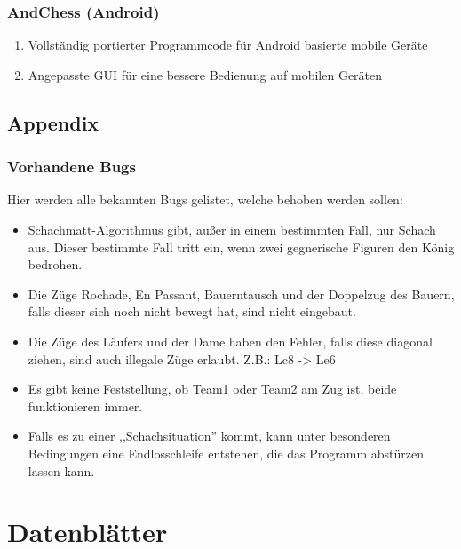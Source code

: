 \documentclass[12pt,a4paper]{article}
\begin{document}
\subsubsection{AndChess (Android)}

\begin{enumerate}
	\item{Vollständig portierter Programmcode für Android basierte mobile Geräte}
	\item{Angepasste GUI für eine bessere Bedienung auf mobilen Geräten}
\end{enumerate}

\subsection{Appendix}
\subsubsection{Vorhandene Bugs}

Hier werden alle bekannten Bugs gelistet, welche behoben werden sollen:

\begin{itemize}
	\item{Schachmatt-Algorithmus gibt, außer in einem bestimmten Fall, nur Schach aus. Dieser bestimmte Fall tritt ein, wenn zwei gegnerische Figuren den König bedrohen.}
	\item{Die Züge Rochade, En Passant, Bauerntausch und der Doppelzug des Bauern, falls dieser sich noch nicht bewegt hat, sind nicht eingebaut.}
	\item{Die Züge des Läufers und der Dame haben den Fehler, falls diese diagonal ziehen, sind auch illegale Züge erlaubt. Z.B.: Lc8 -> Le6}
	\item{Es gibt keine Feststellung, ob Team1 oder Team2 am Zug ist, beide funktionieren immer.}
	\item{Falls es zu einer ,,Schachsituation'' kommt, kann unter besonderen Bedingungen eine Endlosschleife entstehen, die das Programm abstürzen lassen kann.}
\end{itemize}

\renewcommand\thesection{VI}
\section{Datenblätter}
\label{SEC:DATASHEET}
\end{document}

